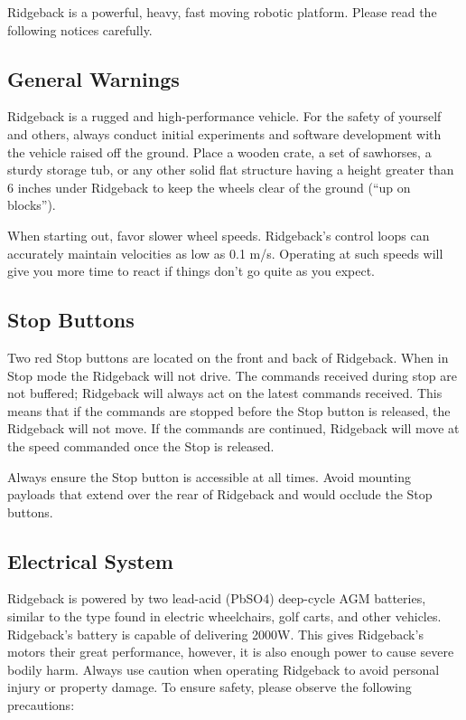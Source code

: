 \documentclass[]{clearpath-latex/clearpath-manual}
\begin{document}
Ridgeback is a powerful, heavy, fast moving robotic platform. Please read the following notices carefully.

\subsection{General Warnings}

Ridgeback is a rugged and high-performance vehicle. For the safety of yourself and others, always conduct initial experiments and software development with the vehicle raised off the ground. Place a wooden crate, a set of sawhorses, a sturdy storage tub, or any other solid flat structure having a height greater than 6 inches under Ridgeback to keep the wheels clear of the ground (“up on blocks”).

When starting out, favor slower wheel speeds. Ridgeback's control loops can accurately maintain velocities as low as 0.1 m/s. Operating at such speeds will give you more time to react if things don’t go quite as you expect.

\subsection{Stop Buttons}

Two red Stop buttons are located on the front and back of Ridgeback. When in Stop mode the Ridgeback will not drive. The commands received during stop are not buffered; Ridgeback will always act on the latest commands received. This means that if the commands are stopped before the Stop button is released, the Ridgeback will not move. If the commands are continued, Ridgeback will move at the speed commanded once the Stop is released.

Always ensure the Stop button is accessible at all times. Avoid mounting payloads that extend over the rear of Ridgeback and would occlude the Stop buttons.

\subsection{Electrical System}

Ridgeback is powered by two lead-acid (PbSO4) deep-cycle AGM batteries, similar to the type found in electric wheelchairs, golf carts, and other vehicles. Ridgeback's battery is capable of delivering 2000W. This gives Ridgeback's motors their great performance, however, it is also enough power to cause severe bodily harm. Always use caution when operating Ridgeback to avoid personal injury or property damage.  To ensure safety, please observe the following precautions:
\end{document}
